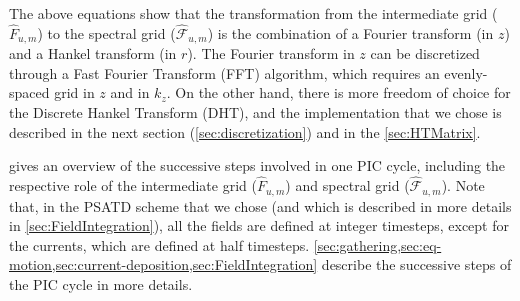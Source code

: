 \documentclass[1p,times]{elsarticle}
\newcommand{\spectral}[1]{\hat{\mathcal{#1}}}
\begin{document}
The above equations show that the transformation from the intermediate
grid ($\hat{F}_{u,m}$) to the spectral grid ($\spectral{F}_{u,m}$) is
the combination of a Fourier transform (in $z$) and a Hankel transform
(in $r$). The Fourier transform in $z$ can be discretized through a Fast Fourier
Transform (FFT) algorithm, which requires an evenly-spaced grid
in $z$ and in $k_z$. On the other hand, there is more freedom of
choice for the Discrete Hankel Transform (DHT), and the implementation that
we chose is described in the next section
(\cref{sec:discretization}) and in the \ref{sec:HTMatrix}.

 gives an overview of the successive steps
involved in one PIC cycle, including the
respective role of the intermediate grid ($\hat{F}_{u,m}$) and
spectral grid ($\spectral{F}_{u,m}$). Note that, in the PSATD
scheme that we chose (and which is described in more details in
\cref{sec:FieldIntegration}), all the fields are defined at integer
timesteps, except for the currents, which are defined at half
timesteps.  
\cref{sec:gathering,sec:eq-motion,sec:current-deposition,sec:FieldIntegration} 
describe the successive steps of the PIC cycle in more details.
\end{document}
